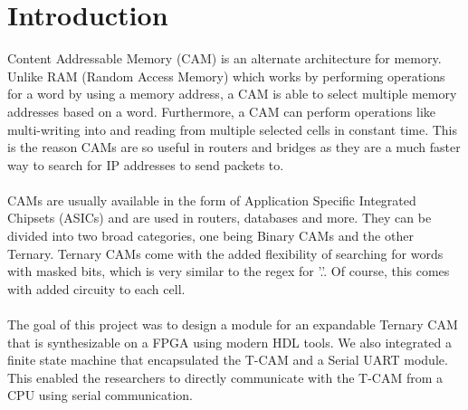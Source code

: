 \section{Introduction}
Content Addressable Memory (CAM) is an alternate architecture for memory. Unlike RAM (Random Access Memory) which works by 
performing operations for a word by using a memory address, a CAM is able to select multiple memory addresses based on a word. 
Furthermore, a CAM can perform operations like multi-writing into and reading from multiple selected cells in constant time.
This is the reason CAMs are so useful in routers and bridges as they are a much faster way to search for IP addresses to send packets to.
\\\\  
CAMs are usually available in the form of Application Specific Integrated Chipsets (ASICs) and are used in routers, databases and more.
They can be divided into two broad categories, one being Binary CAMs and the other Ternary. 
Ternary CAMs come with the added flexibility of searching for words with masked bits, which is very similar to the regex for '.'. 
Of course, this comes with added circuity to each cell. 
\\\\ 
The goal of this project was to design a module for an expandable Ternary CAM that is synthesizable on a FPGA using modern HDL tools. 
We also integrated a finite state machine that encapsulated the T-CAM and a Serial UART module. 
This enabled the researchers to directly communicate with the T-CAM from a CPU using serial communication. 
